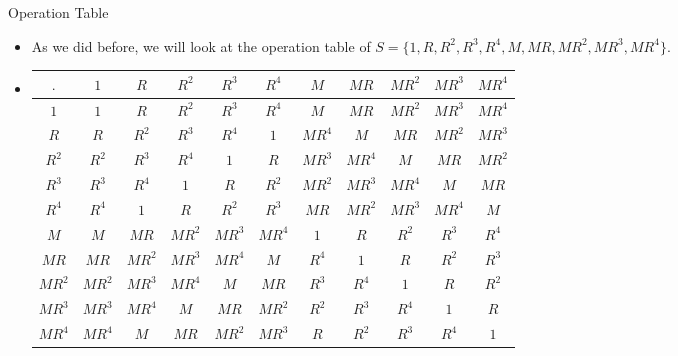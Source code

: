 \documentclass[ %
 10pt, xcolor={dvipsnames,svgnames,x11names,hyperref},
   hyperref={colorlinks=true,citecolor=green,linkcolor=DarkRed,urlcolor=ProcessBlue,anchorcolor=blue}
  ]{beamer}
\newenvironment{stepitemize}{\begin{itemize}[<+->]}{\end{itemize} }
\begin{document}
\begin{frame}{Operation Table}
\begin{stepitemize}
\item As we did before, we will look at the operation table of $S = \{1, R, R^2, R^3, R^4, M, MR, MR^2, MR^3, MR^4\}$.

\bigskip

\item[]
\scriptsize{
\begin{center}
\begin{table}[H]
\begin{tabular}{ c| c | c |c|c|c|c|c|c|c|c}
$.$  & $1$ & $R$ & $R^2$ & $R^3$ & $R^4$ & $M$ & $MR$ & $MR^2$ & $MR^3$ & $MR^4$ \\
\hline
$1$ & $1$ & $R$ & $R^2$ & $R^3$ & $R^4$ & $M$ & $MR$ & $MR^2$ & $MR^3$ & $MR^4$ \\
\hline
$R$ & $R$ & $R^2$ & $R^3$ & $R^4$ & $1$ & $MR^4$ & $M$ & $MR$ & $MR^2$ & $MR^3$\\
\hline
$R^2$ & $R^2$ & $R^3$ & $R^4$ & $1$ & $R$ & $MR^3$ & $MR^4$ & $M$ & $MR$ & $MR^2$\\
\hline
$R^3$ & $R^3$ & $R^4$ & $1$ & $R$ & $R^2$ & $MR^2$ & $MR^3$ & $MR^4$ & $M$ & $MR$\\
\hline
$R^4$ & $R^4$ & $1$ & $R$ & $R^2$ & $R^3$ & $MR$ & $MR^2$ & $MR^3$ & $MR^4$ & $M$\\
\hline
$M$ & $M$ & $MR$ & $MR^2$ & $MR^3$ & $MR^4$ & $1$ & $R$ & $R^2$ & $R^3$ & $R^4$\\
\hline
$MR$ & $MR$ & $MR^2$ & $MR^3$ & $MR^4$ & $M$ & $R^4$ & $1$ & $R$ & $R^2$ & $R^3$\\
\hline
$MR^2$ & $MR^2$ & $MR^3$ & $MR^4$ & $M$ & $MR$ & $R^3$ & $R^4$ & $1$ & $R$ & $R^2$\\
\hline
$MR^3$ & $MR^3$ & $MR^4$ & $M$ & $MR$ & $MR^2$ & $R^2$ & $R^3$ & $R^4$ & $1$ & $R$\\
\hline
$MR^4$ & $MR^4$ & $M$ & $MR$ & $MR^2$ & $MR^3$ & $R$ & $R^2$ & $R^3$ & $R^4$ & $1$\\

\end{tabular}
\end{table}

\end{center}
}

\end{stepitemize}

\end{frame}
\end{document}
